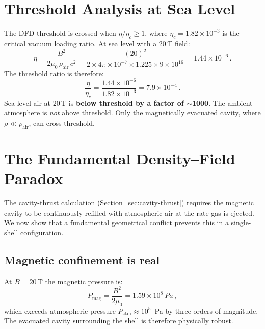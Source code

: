 \documentclass[12pt,twocolumn]{article}
\begin{document}
\section{Threshold Analysis at Sea Level}
\label{sec:threshold}

The DFD threshold is crossed when $\eta/\eta_c \geq 1$, where
$\eta_c = 1.82 \times 10^{-3}$ is the critical vacuum loading ratio.
At sea level with a 20\,T field:
\begin{equation}
  \eta = \frac{B^2}{2\mu_0\,\rho_\mathrm{air}\,c^2}
       = \frac{(20)^2}{2 \times 4\pi\times10^{-7}
         \times 1.225 \times 9\times10^{16}}
       = 1.44 \times 10^{-6}\,.
\end{equation}
The threshold ratio is therefore:
\begin{equation}
  \frac{\eta}{\eta_c}
    = \frac{1.44 \times 10^{-6}}{1.82 \times 10^{-3}}
    = 7.9 \times 10^{-4}\,.
  \label{eq:eta-ratio}
\end{equation}
Sea-level air at 20\,T is \textbf{below threshold by a factor of
$\sim$1000}. The ambient atmosphere is \emph{not} above threshold.
Only the magnetically evacuated cavity, where $\rho \ll \rho_\mathrm{air}$,
can cross threshold.

\section{The Fundamental Density--Field Paradox}
\label{sec:paradox}

The cavity-thrust calculation (Section~\ref{sec:cavity-thrust})
requires the magnetic cavity to be continuously refilled with
atmospheric air at the rate gas is ejected. We now show that a
fundamental geometrical conflict prevents this in a single-shell
configuration.

\subsection{Magnetic confinement is real}

At $B = 20$\,T the magnetic pressure is:
\begin{equation}
  P_\mathrm{mag} = \frac{B^2}{2\mu_0}
                 = 1.59 \times 10^8~\si{Pa}\,,
\end{equation}
which exceeds atmospheric pressure
$P_\mathrm{atm} \approx 10^5$~\si{Pa} by three orders of magnitude.
The evacuated cavity surrounding the shell is therefore physically
robust.
\end{document}
